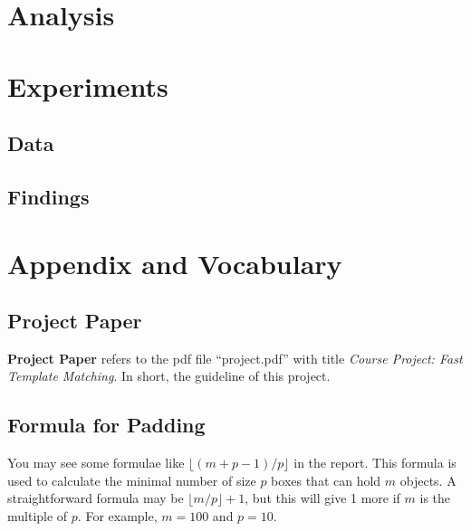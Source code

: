 \documentclass[12pt, a4paper]{article}
\begin{document}
\section{Analysis}
\section{Experiments}
  \subsection{Data}
  \subsection{Findings}
\section{Appendix and Vocabulary}
  \subsection{Project Paper}
    \textbf{Project Paper} refers to the pdf file ``project.pdf'' with title
    \textit{Course Project: Fast Template Matching}. In short, the guideline
    of this project.
  \subsection{Formula for Padding}
    You may see some formulae like $\lfloor(m+p-1)/p\rfloor$ in the report. This
    formula is used to calculate the minimal number of size $p$ boxes that can
    hold $m$ objects. A straightforward formula may be $\lfloor m/p\rfloor+1$,
    but this will give 1 more if $m$ is the multiple of $p$. For example, $m=100$
    and $p=10$.
\end{document}
